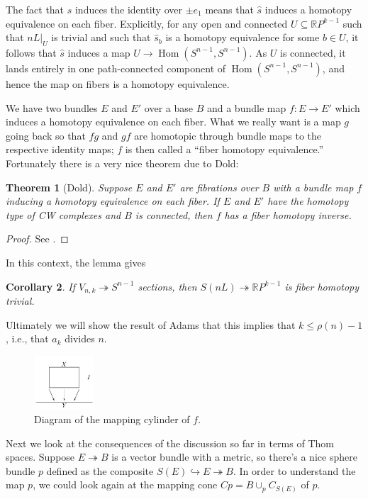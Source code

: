 \documentclass{article}
\newcommand{\R}{\mathbb{R}}
\newcommand{\RP}{\R P}
\newcommand{\into}{\hookrightarrow}
\newcommand{\onto}{\twoheadrightarrow}
\DeclareMathOperator{\Hom}{Hom}
\renewcommand{\to}{\longrightarrow}
\newtheorem{thm}{Theorem}[section]
\newtheorem{cor}[thm]{Corollary}
\theoremstyle{definition}
\begin{document}
The fact that $\hat s$ induces the identity over $\pm e_1$ means that $\hat s$ induces a homotopy equivalence on each fiber.  Explicitly, for any open and connected $U \subseteq \RP^{k-1}$ such that $nL|_U$ is trivial and such that $\hat s_b$ is a homotopy equivalence for some $b \in U$, it follows that $\hat s$ induces a map $U \to \Hom(S^{n-1}, S^{n-1})$.  As $U$ is connected, it lands entirely in one path-connected component of $\Hom(S^{n-1}, S^{n-1})$, and hence the map on fibers is a homotopy equivalence.

We have two bundles $E$ and $E'$ over a base $B$ and a bundle map $f: E \to E'$ which induces a homotopy equivalence on each fiber.  What we really want is a map $g$ going back so that $fg$ and $gf$ are homotopic through bundle maps to the respective identity maps;  $f$ is then called a ``fiber homotopy equivalence.''  Fortunately there is a very nice theorem due to Dold:
\begin{thm}[Dold]\label{LemmaOfDold}
Suppose $E$ and $E'$ are fibrations over $B$ with a bundle map $f$ inducing a homotopy equivalence on each fiber.  If $E$ and $E'$ have the homotopy type of CW complexes and $B$ is connected, then $f$ has a fiber homotopy inverse.
\end{thm}
\begin{proof}
See \cite{James}.
\end{proof}
In this context, the lemma gives
\begin{cor}
If $V_{n, k} \onto S^{n-1}$ sections, then $S(nL) \onto \RP^{k-1}$ is fiber homotopy trivial.
\end{cor}
Ultimately we will show the result of Adams that this implies that $k \le \rho(n) - 1$, i.e., that $a_k$ divides $n$.


\begin{figure}
\centering\includegraphics[width=0.2\textwidth]{figures/fig7.pdf}
\caption{\small Diagram of the mapping cylinder of $f$.}
\end{figure} %
Next we look at the consequences of the discussion so far in terms of Thom spaces.  Suppose $E \onto B$ is a vector bundle with a metric, so there's a nice sphere bundle $p$ defined as the composite $S(E) \into E \onto B$.  In order to understand the map $p$, we could look again at the mapping cone $Cp = B \cup_p C_{S(E)}$ of $p$.  
\end{document}
